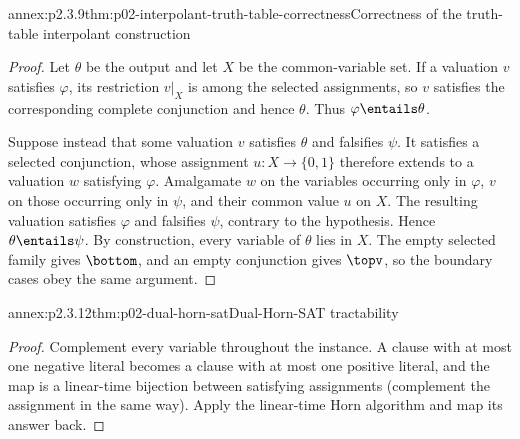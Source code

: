 \begin{annexitem}{annex:p2.3.9}{thm:p02-interpolant-truth-table-correctness}{Correctness of the truth-table interpolant construction}
\begin{proof}
Let \(\theta\) be the output and let \(X\) be the common-variable set.  If a
valuation \(v\) satisfies \(\varphi\), its restriction \(v|_X\) is among the
selected assignments, so \(v\) satisfies the corresponding complete
conjunction and hence \(\theta\).  Thus
\(\varphi\entails\theta\).

Suppose instead that some valuation \(v\) satisfies \(\theta\) and falsifies
\(\psi\).  It satisfies a selected conjunction, whose assignment
\(u:X\to\{0,1\}\) therefore extends to a valuation \(w\) satisfying
\(\varphi\).  Amalgamate \(w\) on the variables occurring only in
\(\varphi\), \(v\) on those occurring only in \(\psi\), and their common
value \(u\) on \(X\).  The resulting valuation satisfies \(\varphi\) and
falsifies \(\psi\), contrary to the hypothesis.  Hence
\(\theta\entails\psi\).  By construction, every variable of \(\theta\) lies
in \(X\).  The empty selected family gives \(\bottom\), and an empty
conjunction gives \(\topv\), so the boundary cases obey the same argument.
\end{proof}
\end{annexitem}

\begin{annexitem}{annex:p2.3.12}{thm:p02-dual-horn-sat}{Dual-Horn-SAT tractability}
\begin{proof}
Complement every variable throughout the instance.  A clause with at most one
negative literal becomes a clause with at most one positive literal, and the
map is a linear-time bijection between satisfying assignments (complement the
assignment in the same way).  Apply the linear-time Horn algorithm and map its
answer back.
\end{proof}
\end{annexitem}
